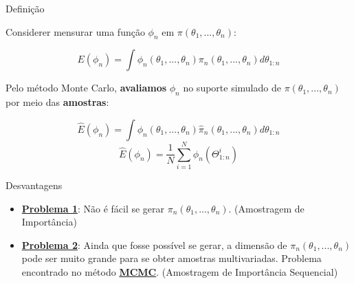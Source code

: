 \documentclass{beamer}
\begin{document}
\begin{frame}{Definição}

Considerer mensurar uma função $\phi_n$ em $\pi(\theta_1,...,\theta_n)$:

$$
E(\phi_n) =  \int \phi_n(\theta_1,...,\theta_n)\pi_n(\theta_1,...,\theta_n)d\theta_{1:n}
$$
\pause

Pelo método Monte Carlo, \textbf{avaliamos}  $\phi_n$ no suporte simulado de $\pi(\theta_1,...,\theta_n)$ por meio das \textbf{amostras}:

$$
\hat{E}(\phi_n) = \int \phi_n(\theta_1,...,\theta_n)\hat{\pi}_n(\theta_1,...,\theta_n)d\theta_{1:n}
$$
\pause
$$
\hat{E}(\phi_n) = \frac{1}{N} \sum_{i=1}^N \phi_n(\Theta^i_{1:n})
$$


\end{frame}

\begin{frame}{Desvantagens}


\begin{itemize}

\item[] \underline{\textbf{Problema 1}}: Não é fácil se gerar $\pi_n(\theta_1,...,\theta_n)$. (Amostragem de Importância)
\pause 

\vspace{.5cm}
\item[] \underline{\textbf{Problema 2}}: Ainda que fosse possível se gerar, a dimensão de $\pi_n(\theta_1,...,\theta_n)$ pode ser muito grande para se obter amostras multivariadas. Problema encontrado no método \underline{\textbf{MCMC}}. (Amostragem de Importância Sequencial)

\end{itemize}
\end{frame}
\end{document}
